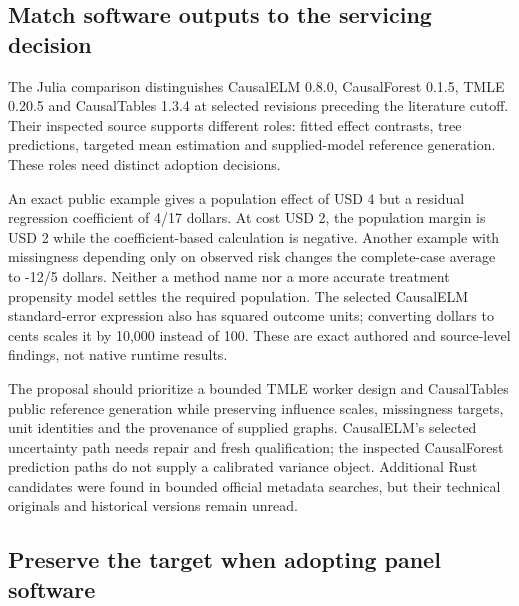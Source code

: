 \hypertarget{match-software-outputs-to-the-servicing-decision}{%
\subsection{Match software outputs to the servicing
decision}\label{match-software-outputs-to-the-servicing-decision}}

The Julia comparison distinguishes CausalELM 0.8.0, CausalForest 0.1.5,
TMLE 0.20.5 and CausalTables 1.3.4 at selected revisions preceding the
literature cutoff. Their inspected source supports different roles:
fitted effect contrasts, tree predictions, targeted mean estimation and
supplied-model reference generation. These roles need distinct adoption
decisions.
\cite{exec21_effects_causalelm,exec21_effects_causalforest,exec21_effects_tmle,exec21_effects_causaltables}

An exact public example gives a population effect of USD 4 but a
residual regression coefficient of 4/17 dollars. At cost USD 2, the
population margin is USD 2 while the coefficient-based calculation is
negative. Another example with missingness depending only on observed
risk changes the complete-case average to -12/5 dollars. Neither a
method name nor a more accurate treatment propensity model settles the
required population. The selected CausalELM standard-error expression
also has squared outcome units; converting dollars to cents scales it by
10,000 instead of 100. These are exact authored and source-level
findings, not native runtime results. \cite{exec21_effects_reference}

The proposal should prioritize a bounded TMLE worker design and
CausalTables public reference generation while preserving influence
scales, missingness targets, unit identities and the provenance of
supplied graphs. CausalELM's selected uncertainty path needs repair and
fresh qualification; the inspected CausalForest prediction paths do not
supply a calibrated variance object. Additional Rust candidates were
found in bounded official metadata searches, but their technical
originals and historical versions remain unread.
\cite{exec21_effects_discovery}

\hypertarget{preserve-the-target-when-adopting-panel-software}{%
\subsection{Preserve the target when adopting panel
software}\label{preserve-the-target-when-adopting-panel-software}}

